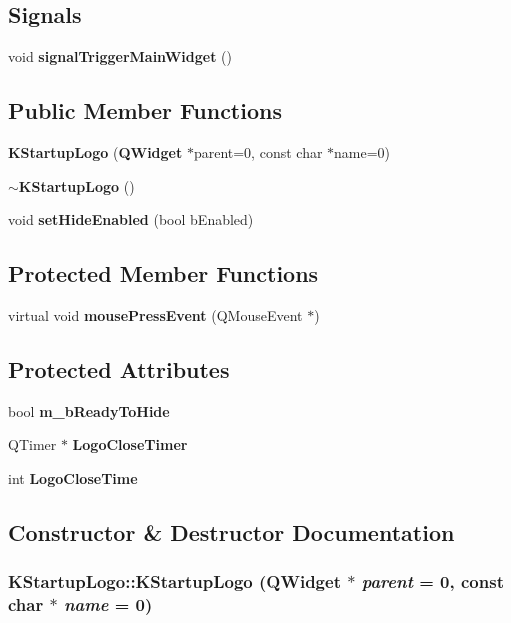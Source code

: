 \subsection*{Signals}
\begin{CompactItemize}
\item 
void {\bf signal\-Trigger\-Main\-Widget} ()
\end{CompactItemize}
\subsection*{Public Member Functions}
\begin{CompactItemize}
\item 
{\bf KStartup\-Logo} ({\bf QWidget} $\ast$parent=0, const char $\ast$name=0)
\item 
{\bf $\sim$KStartup\-Logo} ()
\item 
void {\bf set\-Hide\-Enabled} (bool b\-Enabled)
\end{CompactItemize}
\subsection*{Protected Member Functions}
\begin{CompactItemize}
\item 
virtual void {\bf mouse\-Press\-Event} (QMouse\-Event $\ast$)
\end{CompactItemize}
\subsection*{Protected Attributes}
\begin{CompactItemize}
\item 
bool {\bf m\_\-b\-Ready\-To\-Hide}
\item 
QTimer $\ast$ {\bf Logo\-Close\-Timer}
\item 
int {\bf Logo\-Close\-Time}
\end{CompactItemize}


\subsection{Constructor \& Destructor Documentation}
\subsubsection{\setlength{\rightskip}{0pt plus 5cm}KStartup\-Logo::KStartup\-Logo ({\bf QWidget} $\ast$ {\em parent} = 0, const char $\ast$ {\em name} = 0)}\label{classKStartupLogo_KStartupLogoa0}




